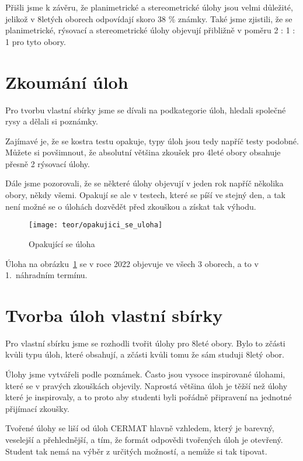 Přišli jsme k závěru, že planimetrické a stereometrické úlohy jsou velmi důležité, jelikož v 8letých oborech odpovídají skoro 38 \% známky. Také jsme zjistili, že se planimetrické, rýsovací a stereometrické úlohy objevují přibližně v poměru 2 : 1 : 1 pro tyto obory.




\section{Zkoumání úloh}

Pro tvorbu vlastní sbírky jsme se dívali na podkategorie úloh, hledali společné rysy a dělali si poznámky.

Zajímavé je, že se kostra testu opakuje, typy úloh jsou tedy napříč testy podobné. Můžete si povšimnout, že absolutní většina zkoušek pro 4leté obory obsahuje přesně 2 rýsovací úlohy.

Dále jsme pozorovali, že se některé úlohy objevují v jeden rok napříč několika obory, někdy všemi. Opakují se ale v testech, které se píší ve stejný den, a tak není možné se o úlohách dozvědět před zkouškou a získat tak výhodu.


\begin{figure}[h]
    \centering
    \texttt{[image: teor/opakujici\_se\_uloha]}
    \caption{Opakující se úloha ~\cite{CERMAT_pdfka}}
    \label{fig:opak_uloha}
\end{figure}

Úloha na obrázku~\ref{fig:opak_uloha} se v roce 2022 objevuje ve všech 3 oborech, a to v 1.~náhradním termínu.


\section{Tvorba úloh vlastní sbírky}

Pro vlastní sbírku jsme se rozhodli tvořit úlohy pro 8leté obory. Bylo to zčásti kvůli typu úloh, které obsahují, a zčásti kvůli tomu že sám studuji 8letý obor.

Úlohy jsme vytvářeli podle poznámek. Často jsou vysoce inspirované úlohami, které se v pravých zkouškách objevily. Naprostá většina úloh je těžší než úlohy které je inspirovaly, a to proto aby studenti byli pořádně připravení na jednotné přijímací zkoušky.

Tvořené úlohy se liší od úloh CERMAT hlavně vzhledem, který je barevný, veselejší a přehlednější, a tím, že formát odpovědi tvořených úloh je otevřený. Student tak nemá na výběr z určitých možností, a nemůže si tak tipovat.

